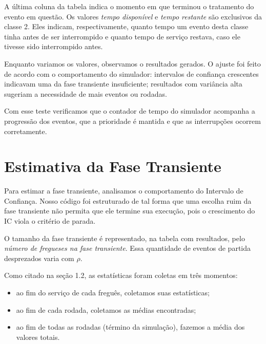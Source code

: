 \documentclass[a4paper,12pt]{report}
\begin{document}
A última coluna da tabela indica o momento em que terminou o tratamento do evento em questão. Os valores \textit{tempo disponível} e \textit{tempo restante} são exclusivos da classe 2. Eles indicam, respectivamente, quanto tempo um evento desta classe tinha antes de ser interrompido e quanto tempo de serviço restava, caso ele tivesse sido interrompido antes.

Enquanto variamos os valores, observamos o resultados gerados. O ajuste foi feito de acordo com o comportamento do simulador: intervalos de confiança crescentes indicavam uma da fase transiente insuficiente; resultados com variância alta sugeriam a necessidade de mais eventos ou rodadas.

Com esse teste verificamos que o contador de tempo do simulador acompanha a progressão dos eventos, que a prioridade é mantida e que as interrupções ocorrem corretamente.

\chapter{Estimativa da Fase Transiente}
Para estimar a fase transiente, analisamos o comportamento do Intervalo de Confiança. Nosso código foi estruturado de tal forma que uma escolha ruim da fase transiente não permita que ele termine sua execução, pois o crescimento do IC viola o critério de parada.

O tamanho da fase transiente é representado, na tabela com resultados, pelo \textit{número de fregueses na fase transiente}. Essa quantidade de eventos de partida desprezados varia com $\rho$.

Como citado na seção 1.2, as estatísticas foram coletas em três momentos:
\begin{itemize}
  \item ao fim do serviço de cada freguês, coletamos suas estatísticas;
  \item ao fim de cada rodada, coletamos as médias encontradas;
  \item ao fim de todas as rodadas (término da simulação), fazemos a média dos valores totais.
\end{itemize}


\end{document}
